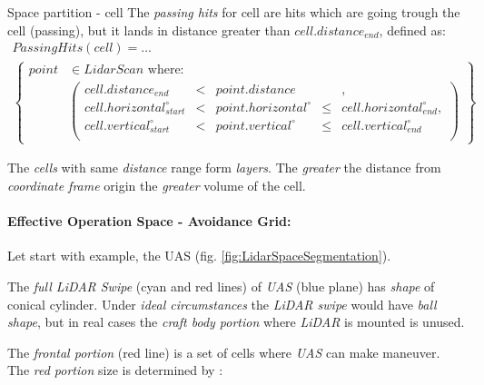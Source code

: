 \begin{definition}{Space partition - cell}
    \noindent The \emph{passing hits} for cell are hits which are going trough the cell (passing), but it lands in distance greater than $cell.distance_{end}$, defined as:
    \begin{multline}\label{eq:passingHitsCell}
        Passing Hits(cell)=
        \dots\\
            \left \{
                \begin{aligned}
                point& \in Lidar Scan \text{ where}:\\
                    &\left(\begin{aligned}
                        cell.distance_{end}&<& point.distance &&,\\
                        cell.horizontal^\circ_{start} &<& point.horizontal^\circ &\le&  cell.horizontal^\circ_{end},\\
                        cell.vertical^\circ_{start} &<& point.vertical^\circ &\le& cell.vertical^\circ_{end}\\
                    \end{aligned}\right)
                \end{aligned}
            \right\}
    \end{multline}
\end{definition}

\begin{note}
    The \emph{cells} with same \emph{distance} range form \emph{layers}. The \emph{greater} the distance from \emph{coordinate frame} origin the \emph{greater} volume of the cell.     
\end{note}

\paragraph{Effective Operation Space - Avoidance Grid:} Let start with example, the UAS  (fig. \ref{fig:LidarSpaceSegmentation}). 



The \emph{full LiDAR Swipe} (cyan and red lines) of \emph{UAS} (blue plane) has \emph{shape} of conical cylinder. Under \emph{ideal circumstances} the \emph{LiDAR swipe} would have \emph{ball shape}, but in real cases the \emph{craft body portion} where \emph{LiDAR} is mounted is unused.

The \emph{frontal portion} (red line) is a set of cells where \emph{UAS} can make maneuver. The \emph{red portion} size is determined by \cite{zaiane2002clustering}:

